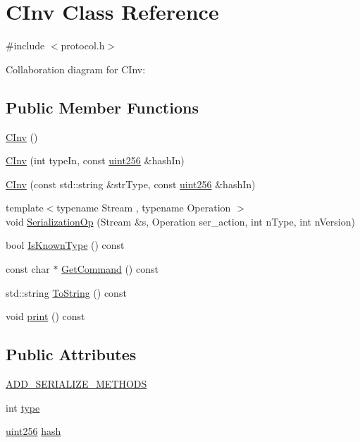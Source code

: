 \hypertarget{class_c_inv}{}\section{C\+Inv Class Reference}
\label{class_c_inv}


{\ttfamily \#include $<$protocol.\+h$>$}



Collaboration diagram for C\+Inv\+:
\subsection*{Public Member Functions}
\begin{DoxyCompactItemize}
\item 
\hyperlink{class_c_inv_a831d208e5e1b142e36a89999b81c2298}{C\+Inv} ()
\item 
\hyperlink{class_c_inv_a4c6e02df7b10378f876ecc76c6b50301}{C\+Inv} (int type\+In, const \hyperlink{classuint256}{uint256} \&hash\+In)
\item 
\hyperlink{class_c_inv_a412cb8fdd0bfe185f770fec91a3e13c4}{C\+Inv} (const std\+::string \&str\+Type, const \hyperlink{classuint256}{uint256} \&hash\+In)
\item 
{\footnotesize template$<$typename Stream , typename Operation $>$ }\\void \hyperlink{class_c_inv_a7f56c1696e6c5c7ca36c1637f94dd1a0}{Serialization\+Op} (Stream \&s, Operation ser\+\_\+action, int n\+Type, int n\+Version)
\item 
bool \hyperlink{class_c_inv_a9259d1e8d828c6b6ea729d36d16cd84f}{Is\+Known\+Type} () const 
\item 
const char $\ast$ \hyperlink{class_c_inv_a393dc4726f105b25090a6ee4952e71b5}{Get\+Command} () const 
\item 
std\+::string \hyperlink{class_c_inv_a87a826a842d549c2747ced0c1a90bc18}{To\+String} () const 
\item 
void \hyperlink{class_c_inv_ac694be0201a6e5b34efa1c604498186c}{print} () const 
\end{DoxyCompactItemize}
\subsection*{Public Attributes}
\begin{DoxyCompactItemize}
\item 
\hyperlink{class_c_inv_a3dc91b40ff6fe8c2c8879c81de67e209}{A\+D\+D\+\_\+\+S\+E\+R\+I\+A\+L\+I\+Z\+E\+\_\+\+M\+E\+T\+H\+O\+D\+S}
\item 
int \hyperlink{class_c_inv_a2da8a26c6b8824011e3144459d278c75}{type}
\item 
\hyperlink{classuint256}{uint256} \hyperlink{class_c_inv_abfa04c38e9c0def9a2b09a9c43929744}{hash}
\end{DoxyCompactItemize}
